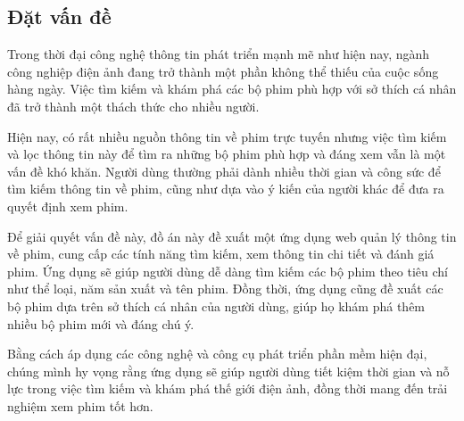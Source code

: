 \documentclass[12pt]{article}
\begin{document}
\subsection{ Đặt vấn đề}
Trong thời đại công nghệ thông tin phát triển mạnh mẽ như hiện nay, ngành công nghiệp điện ảnh đang trở thành một phần không thể thiếu của cuộc sống hàng ngày. Việc tìm kiếm và khám phá các bộ phim phù hợp với sở thích cá nhân đã trở thành một thách thức cho nhiều người.

Hiện nay, có rất nhiều nguồn thông tin về phim trực tuyến nhưng việc tìm kiếm và lọc thông tin này để tìm ra những bộ phim phù hợp và đáng xem vẫn là một vấn đề khó khăn. Người dùng thường phải dành nhiều thời gian và công sức để tìm kiếm thông tin về phim, cũng như dựa vào ý kiến của người khác để đưa ra quyết định xem phim.

Để giải quyết vấn đề này, đồ án này đề xuất một ứng dụng web quản lý thông tin về phim, cung cấp các tính năng tìm kiếm, xem thông tin chi tiết và đánh giá phim. Ứng dụng sẽ giúp người dùng dễ dàng tìm kiếm các bộ phim theo tiêu chí như thể loại, năm sản xuất và tên phim. Đồng thời, ứng dụng cũng đề xuất các bộ phim dựa trên sở thích cá nhân của người dùng, giúp họ khám phá thêm nhiều bộ phim mới và đáng chú ý.

Bằng cách áp dụng các công nghệ và công cụ phát triển phần mềm hiện đại, chúng mình hy vọng rằng ứng dụng sẽ giúp người dùng tiết kiệm thời gian và nỗ lực trong việc tìm kiếm và khám phá thế giới điện ảnh, đồng thời mang đến trải nghiệm xem phim tốt hơn.
\end{document}
